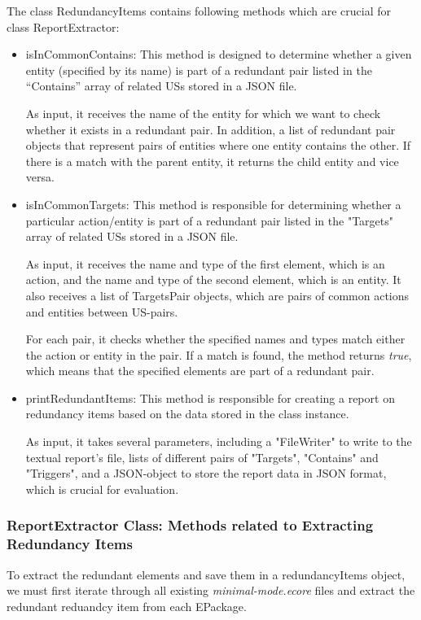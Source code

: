The class RedundancyItems contains following methods which are crucial for class ReportExtractor:
\begin{itemize}
	\item isInCommonContains: This method is designed to determine whether a given entity (specified by its name) is part of a redundant pair listed in the \enquote{Contains} array of related USs stored in a JSON file.
	
	As input, it receives the name of the entity for which we want to check whether it exists in a redundant pair. In addition, a list of redundant pair objects that represent pairs of entities where one entity contains the other. If there is a match with the parent entity, it returns the child entity and vice versa.
	\item isInCommonTargets: This method is responsible for determining whether a particular action/entity is part of a redundant pair listed in the "Targets" array of related USs stored in a JSON file.
	
	As input, it receives the name and type of the first element, which is an action, and the name and type of the second element, which is an entity. It also receives a list of TargetsPair objects, which are pairs of common actions and entities between US-pairs.
	
	For each pair, it checks whether the specified names and types match either the action or entity in the pair. If a match is found, the method returns \textit{true}, which means that the specified elements are part of a redundant pair.
	\item printRedundantItems: This method is responsible for creating a report on redundancy items based on the data stored in the class instance. 
	
	As input, it takes several parameters, including a "FileWriter" to write to the textual report's file, lists of different pairs of "Targets", "Contains" and "Triggers", and a JSON-object to store the report data in JSON format, which is crucial for evaluation.
\end{itemize}
\subsubsection*{ReportExtractor Class: Methods related to Extracting Redundancy Items}
To extract the redundant elements and save them in a redundancyItems object, we must first iterate through all existing \textit{minimal-mode.ecore} files and extract the redundant reduandcy item from each EPackage.

